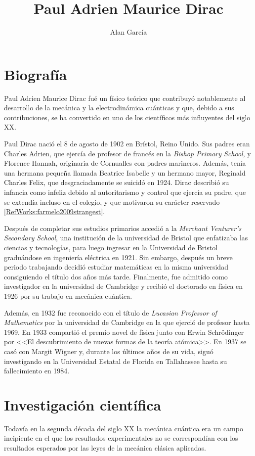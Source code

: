 \title{Paul Adrien Maurice Dirac}
\author{Alan García}


\maketitle \newpage

\section{Biografía}
Paul Adrien Maurice Dirac fué un físico teórico que contribuyó notablemente al desarrollo de la mecánica y la electrodinámica cuánticas y que, debido a sus contribuciones, se ha convertido en uno de los científicos más influyentes del siglo XX. 

Paul Dirac nació el 8 de agosto de 1902 en Brístol, Reino Unido. Sus padres eran Charles Adrien, que ejercía de profesor de francés en la \textit{Bishop Primary School}, y Florence Hannah, originaria de Cornualles con padres marineros. Además, tenía una hermana pequeña llamada Beatrice Isabelle y un hermano mayor, Reginald Charles Felix, que desgraciadamente se suicidó en 1924. Dirac describió su infancia como infeliz debido al autoritarismo y control que ejercía su padre, que se extendía incluso en el colegio, y que motivaron su carácter reservado \ref{RefWorks:farmelo2009strangest}.

Después de completar sus estudios primarios accedió a la \textit{Merchant Venturer’s Secondary School}, una institución de la universidad de Bristol que enfatizaba las ciencias y tecnologías, para luego ingresar en la Universidad de Bristol graduándose en ingeniería eléctrica en 1921. Sin embargo, después un breve periodo trabajando decidió estudiar matemáticas en la misma universidad consiguiendo el título dos años más tarde. Finalmente, fue admitido como investigador en la universidad de Cambridge y recibió el doctorado en física en 1926 por su trabajo en mecánica cuántica. 

Además, en 1932 fue reconocido con el título de \textit{Lucasian Professor of Mathematics} por la universidad de Cambridge en la que ejerció de profesor hasta 1969. En 1933 compartió el premio novel de física junto con Erwin Schrödinger por <<El descubrimiento de nuevas formas de la teoría atómica>>. En 1937 se casó con Margit Wigner y, durante los últimos años de su vida, siguó investigando en la Universidad Estatal de Florida en Tallahassee hasta su fallecimiento en 1984.

\section{Investigación científica}
Todavía en la segunda década del siglo XX la mecánica cuántica era un campo incipiente en el que los resultados experimentales no se correspondían con los resultados esperados por las leyes de la mecánica clásica aplicadas. 

